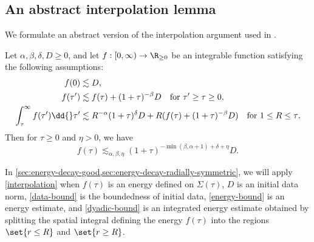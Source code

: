 \documentclass[10pt, reqno]{amsart}
\begin{document}
\subsection{An abstract interpolation lemma}
\label{abstract-interpolation}
We formulate an abstract version of the interpolation argument used in
\cite[Prop.~8.2]{GAJIC2023110058}.
\begin{lemma}
Let \(\alpha{},\beta{},\delta{},D\ge 0\), and let \(f:[0,\infty)\to
\R_{\ge 0}\) be an integrable function satisfying the following assumptions:
\begin{align}
f(0)&\lesssim D,\label{data-bound}\\
f(\tau{}')&\lesssim f(\tau{}) + (1+\tau{})^{-\beta{}}D\quad \textnormal{for }\tau{}'\ge \tau{}\ge 0, \label{energy-bound}\\
\int_{\tau{}}^{\infty} f(\tau{}')\dd{}\tau{}'&\lesssim R^{-\alpha{}}(1+\tau{})^\delta{}D + R(f(\tau{}) + (1+\tau{})^{-\beta{}}D)\quad \textnormal{for }1\le R\le \tau{}. \label{dyadic-bound}
\end{align}
Then for \(\tau{}\ge 0\) and \(\eta{} > 0\), we have
\begin{equation}\label{iteration-conc}
f(\tau{})\lesssim_{\alpha{},\beta{},\eta{}} (1+\tau{})^{-\min (\beta{},\alpha{}+1) + \delta{} + \eta{}}D.
\end{equation}
\label{interpolation}
\end{lemma}
\begin{remark}
In \cref{sec:energy-decay-good,sec:energy-decay-radially-symmetric}, we will apply
\cref{interpolation} when \(f(\tau{})\) is an energy defined on \(\Sigma{}(\tau{})\),
\(D\) is an initial data norm, \cref{data-bound} is the boundedness of initial
data, \cref{energy-bound} is an energy estimate, and \cref{dyadic-bound} is an
integrated energy estimate obtained by splitting the spatial integral defining
the energy \(f(\tau{})\) into the regions \(\set{r\le R}\) and \(\set{r\ge R}\).
\end{remark}
\end{document}
